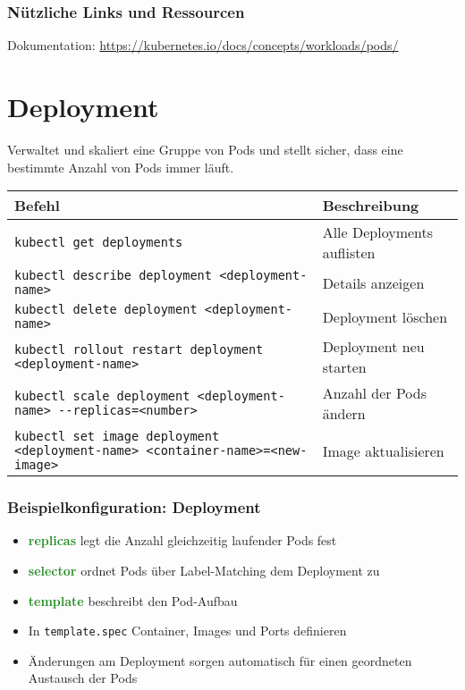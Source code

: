 \subsubsection{Nützliche Links und Ressourcen}
Dokumentation: \url{https://kubernetes.io/docs/concepts/workloads/pods/}

\newpage
\section{Deployment}
Verwaltet und skaliert eine Gruppe von Pods und stellt sicher, dass eine bestimmte Anzahl von Pods immer läuft. \\

\noindent
\begin{tabular}{|p{}|p{}|}
\hline
\textbf{Befehl} & \textbf{Beschreibung} \\
\hline
\texttt{kubectl get deployments} & Alle Deployments auflisten \\
\texttt{kubectl describe deployment <deployment-name>} & Details anzeigen \\
\texttt{kubectl delete deployment <deployment-name>} & Deployment löschen \\
\texttt{kubectl rollout restart deployment <deployment-name>} & Deployment neu starten \\
\texttt{kubectl scale deployment <deployment-name> {-}{-}replicas=<number>} & Anzahl der Pods ändern \\
\texttt{kubectl set image deployment <deployment-name> <container-name>=<new-image>} & Image aktualisieren \\
\hline
\end{tabular}
\noindent
\subsubsection{Beispielkonfiguration: Deployment}

\begin{itemize}
    \item \textcolor{ForestGreen}{\textbf{replicas}} legt die Anzahl gleichzeitig laufender Pods fest
    \item \textcolor{ForestGreen}{\textbf{selector}} ordnet Pods über Label-Matching dem Deployment zu
    \item \textcolor{ForestGreen}{\textbf{template}} beschreibt den Pod-Aufbau
    \item In \texttt{template.spec} Container, Images und Ports definieren
    \item Änderungen am Deployment sorgen automatisch für einen geordneten Austausch der Pods
\end{itemize}
